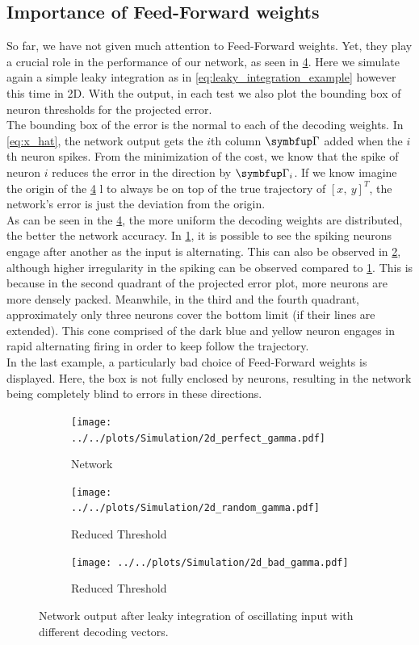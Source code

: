 \subsection{Importance of Feed-Forward weights}\label{ssec:feefforward_importance}
So far, we have not given much attention to Feed-Forward weights. Yet, they play a crucial role in the performance of our network, as seen in \cref{fig:sim_res_3}. Here we simulate again a simple leaky integration as in \cref{eq:leaky_integration_example} however this time in 2D. With the output, in each test we also plot the bounding box of neuron thresholds for the projected error.\\
The bounding box of the error is the normal to each of the decoding weights. In \cref{eq:x_hat}, the network output gets the $i$th column $\bmu{\Gamma}$ added when the $i$th neuron spikes. From the minimization of the cost, we know that the spike of neuron $i$ reduces the error in the direction by $\bmu{\Gamma}_i$. If we know imagine the origin of the \cref{fig:sim_res_3} l to always be on top of the true trajectory of $\left[x ,\ y\right]^T$, the network's error is just the deviation from the origin.\\
As can be seen in the \cref{fig:sim_res_3}, the more uniform the decoding weights are distributed, the better the network accuracy. In \cref{fig:sim_perfect_gamma}, it is possible to see the spiking neurons engage after another as the input is alternating. This can also be observed in \cref{fig:sim_random_gamma}, although higher irregularity in the spiking can be observed compared to \cref{fig:sim_perfect_gamma}. This is because in the second quadrant of the projected error plot, more neurons are more densely packed. Meanwhile, in the third and the fourth quadrant, approximately only three neurons cover the bottom limit (if their lines are extended). This cone comprised of the dark blue and yellow neuron engages in rapid alternating firing in order to keep follow the trajectory.\\
In the last example, a particularly bad choice of Feed-Forward weights is displayed. Here, the box is not fully enclosed by neurons, resulting in the network being completely blind to errors in these directions.
\begin{figure}[h!]
		\centering
	\begin{subfigure}[t]{0.6\textwidth}
		\centering
		\texttt{[image: ../../plots/Simulation/2d\_perfect\_gamma.pdf]}
		\caption{Network }
		\label{fig:sim_perfect_gamma}
	\end{subfigure}
	\hfill
	\begin{subfigure}[t]{0.6\textwidth}
		\centering
		\texttt{[image: ../../plots/Simulation/2d\_random\_gamma.pdf]}
		\caption{Reduced Threshold}
		\label{fig:sim_random_gamma}
	\end{subfigure}
	\hfill
\begin{subfigure}[t]{0.6\textwidth}
	\centering
	\texttt{[image: ../../plots/Simulation/2d\_bad\_gamma.pdf]}
	\caption{Reduced Threshold}
	\label{fig:sim_bad_gamma}
\end{subfigure}
	\caption{Network output after leaky integration of oscillating input with different decoding vectors.}
	\label{fig:sim_res_3}
\end{figure}


